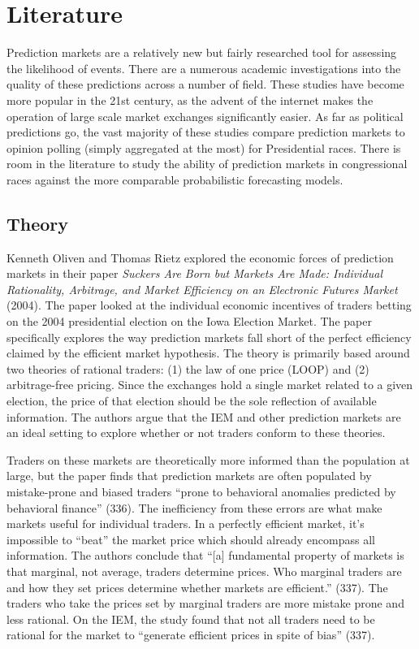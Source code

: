 \documentclass[11pt,]{article}
\begin{document}
\hypertarget{literature}{%
\section{Literature}\label{literature}}

Prediction markets are a relatively new but fairly researched tool for
assessing the likelihood of events. There are a numerous academic
investigations into the quality of these predictions across a number of
field. These studies have become more popular in the 21st century, as
the advent of the internet makes the operation of large scale market
exchanges significantly easier. As far as political predictions go, the
vast majority of these studies compare prediction markets to opinion
polling (simply aggregated at the most) for Presidential races. There is
room in the literature to study the ability of prediction markets in
congressional races against the more comparable probabilistic
forecasting models.

\hypertarget{theory}{%
\subsection{Theory}\label{theory}}

Kenneth Oliven and Thomas Rietz explored the economic forces of
prediction markets in their paper \emph{Suckers Are Born but Markets Are
Made: Individual Rationality, Arbitrage, and Market Efficiency on an
Electronic Futures Market} (2004). The paper looked at the individual
economic incentives of traders betting on the 2004 presidential election
on the Iowa Election Market. The paper specifically explores the way
prediction markets fall short of the perfect efficiency claimed by the
efficient market hypothesis. The theory is primarily based around two
theories of rational traders: (1) the law of one price (LOOP) and (2)
arbitrage-free pricing. Since the exchanges hold a single market related
to a given election, the price of that election should be the sole
reflection of available information. The authors argue that the IEM and
other prediction markets are an ideal setting to explore whether or not
traders conform to these theories.

Traders on these markets are theoretically more informed than the
population at large, but the paper finds that prediction markets are
often populated by mistake-prone and biased traders ``prone to
behavioral anomalies predicted by behavioral finance'' (336). The
inefficiency from these errors are what make markets useful for
individual traders. In a perfectly efficient market, it's impossible to
``beat'' the market price which should already encompass all
information. The authors conclude that ``{[}a{]} fundamental property of
markets is that marginal, not average, traders determine prices. Who
marginal traders are and how they set prices determine whether markets
are efficient.'' (337). The traders who take the prices set by marginal
traders are more mistake prone and less rational. On the IEM, the study
found that not all traders need to be rational for the market to
``generate efficient prices in spite of bias'' (337).
\end{document}
